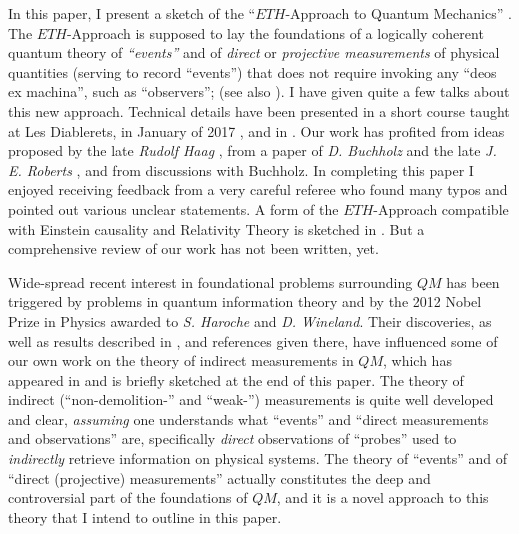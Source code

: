 \documentclass[a4paper,11pt]{article}
\begin{document}
In this paper, I present a sketch of the ``$ETH$-Approach to Quantum Mechanics'' \cite{FS-Prob-Theory, BFS-forks, Schubnel-thesis}. The $ETH$-Approach is supposed to lay the foundations of a logically coherent quantum theory of \textit{``events''} \cite{Haag} and of \textit{direct} or \textit{projective measurements} of physical quantities (serving to record ``events'') that does not require invoking any ``deos ex machina'', such as ``observers''; (see also \cite{Durr-Teufel}). I have given quite a few talks about this new approach. Technical details have been presented in a short course taught at Les Diablerets, in January of 2017 \cite{Les-Diablerets}, and in \cite{FFS, FS-state-prep}. Our work has profited from ideas proposed by the late \textit{Rudolf Haag} \cite{Haag}, from a paper of \textit{D. Buchholz} and the late \textit{J. E. Roberts} \cite{Buchholz}, and from discussions with Buchholz. In completing this paper I enjoyed receiving feedback from a very careful referee who found many typos and pointed out various unclear statements. A form of the $ETH$-Approach compatible with Einstein causality and Relativity Theory is sketched in \cite{Fr}. But a comprehensive review of our work has not been written, yet. 

Wide-spread recent interest in foundational problems surrounding $QM$ has been triggered by problems in quantum information theory and by the 2012 Nobel Prize in Physics awarded to \textit{S. Haroche} \cite{Raimond-Haroche} and \textit{D. Wineland}. Their discoveries, as well as results described in \cite{Bauer-Bernard, Maassen-Kummerer}, and references given there, have influenced some of our own work on the theory of indirect measurements in $QM$, which has appeared in \cite{BFFS, BCFFS-1, BCFFS-2} and is briefly sketched at the end of this paper. The theory of indirect (``non-demolition-'' and ``weak-'') measurements is quite well developed and clear, \textit{assuming} one understands what ``events'' and ``direct measurements and observations'' are, specifically \textit{direct} observations of ``probes'' used to \textit{indirectly} retrieve information on physical systems. The theory of ``events'' and of ``direct (projective) measurements'' actually constitutes the deep and controversial part of the foundations of $QM$, and it is a novel approach to this theory that I intend to outline in this paper. 
\end{document}
